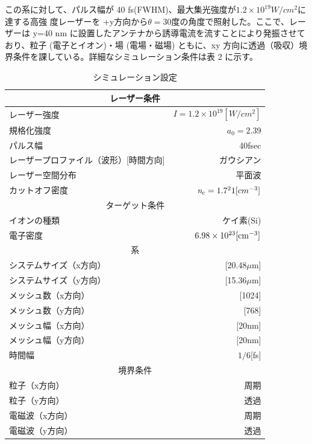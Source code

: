 \documentclass[a4paper,11pt,titlepage]{jarticle}
\numberwithin{equation}{section} %
\begin{document}
この系に対して、パルス幅が 40 fs(FWHM)、最大集光強度が$1.2×10^{19}W/cm^2$に達する高強
度レーザーを +y方向から$\theta=$30度の角度で照射した。ここで、レーザーは y=40 nm に設置したアンテナから誘導電流を流すことにより発振させており、粒子 (電子とイオン)・場 (電場・磁場) ともに、xy 方向に透過（吸収）境界条件を課している。詳細なシミュレーション条件は表 2 に示す。

\begin{table}[H]
  \begin{center}
    \caption{シミュレーション設定}
  \begin{tabular}{|l|r|} \hline
    \multicolumn{2}{|c|}{レーザー条件} \\ \hline
    レーザー強度 & $\textit{I}=1.2\times  10^{19}[W/cm^2]$ \\ 
    規格化強度 & $\textit{a} _0 = 2.39$ \\
    パルス幅 & 40fsec \\ 
    レーザープロファイル（波形）[時間方向] & ガウシアン \\
    レーザー空間分布 & 平面波 \\
    カットオフ密度 & $\textit{n} _c = 1.7 \time 10^21 [cm^{-3}]$ \\\hline
    \multicolumn{2}{|c|}{ターゲット条件} \\ \hline
    イオンの種類 & ケイ素(Si) \\
    電子密度 &$6.98 \times  10 ^{23} [\rm{cm}^{-3}]$ \\\hline
    \multicolumn{2}{|c|}{系} \\ \hline
    システムサイズ（x方向） & [20.48$\mu $m] \\
    システムサイズ（y方向） & [15.36$\mu $m] \\
    メッシュ数（x方向） & [1024] \\
    メッシュ数（y方向） & [768] \\
    メッシュ幅（x方向） & [20nm] \\
    メッシュ幅（y方向） & [20nm] \\
    時間幅 & $1/6$[fs] \\ \hline
    \multicolumn{2}{|c|}{境界条件} \\ \hline
    粒子（x方向） & 周期 \\
    粒子（y方向） & 透過 \\
    電磁波（x方向） & 周期 \\
    電磁波（y方向） & 透過 \\ \hline
  \end{tabular}
  \end{center}
  \end{table}
\end{document}
